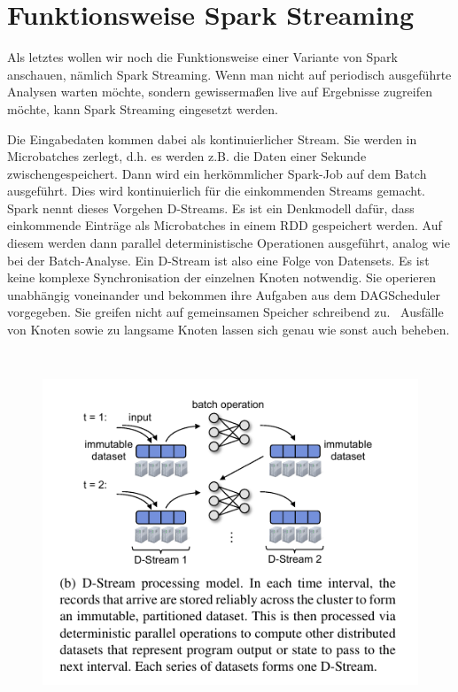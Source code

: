 \documentclass[letterpaper]{article}
\begin{document}
\section[Funktionsweise Spark
Streaming]{\rmfamily Funktionsweise Spark
Streaming}
Als letztes wollen wir noch die Funktionsweise einer Variante von Spark
anschauen, nämlich Spark Streaming. Wenn man nicht auf periodisch
ausgeführte Analysen warten möchte, sondern gewissermaßen live auf
Ergebnisse zugreifen möchte, kann Spark Streaming eingesetzt werden.

Die Eingabedaten kommen dabei als kontinuierlicher Stream. Sie werden in
Microbatches zerlegt, d.h. es werden z.B. die Daten einer Sekunde
zwischengespeichert. Dann wird ein herkömmlicher Spark-Job auf dem
Batch ausgeführt. Dies wird kontinuierlich für die einkommenden Streams
gemacht. Spark nennt dieses Vorgehen D-Streams. Es ist ein Denkmodell
dafür, dass einkommende Einträge als Microbatches in einem RDD
gespeichert werden. Auf diesem werden dann parallel deterministische
Operationen ausgeführt, analog wie bei der Batch-Analyse. Ein D-Stream
ist also eine Folge von Datensets. Es ist keine komplexe
Synchronisation der einzelnen Knoten notwendig. Sie operieren
unabhängig voneinander und bekommen ihre Aufgaben aus dem DAGScheduler
vorgegeben. Sie greifen nicht auf gemeinsamen Speicher schreibend zu.
\ Ausfälle von Knoten sowie zu langsame Knoten lassen sich genau wie
sonst auch beheben. 

\begin{figure}
\centering
\includegraphics[width=13.227cm,height=10.793cm]{bilder/Seminartext-img4.png}
\end{figure}
\end{document}
